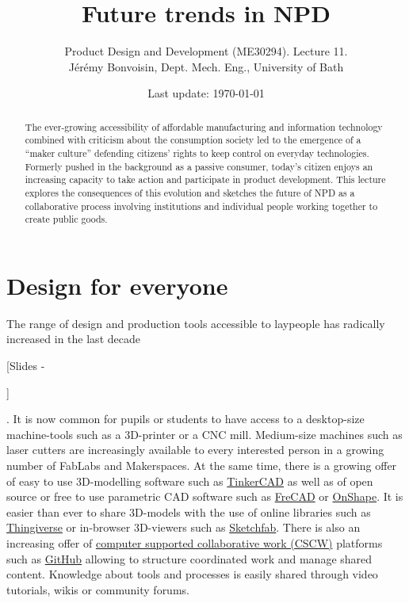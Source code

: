 \documentclass{article}
\newcounter{slide}
\begin{document}
\title{Future trends in NPD}

\author{Product Design and Development (ME30294). Lecture 11. \\ Jérémy Bonvoisin, Dept. Mech. Eng., University of Bath}
\date{Last update: \today}

\maketitle

\begin{abstract}
The ever-growing accessibility of affordable manufacturing and information technology combined with criticism about the consumption society led to the emergence of a ``maker culture'' defending citizens' rights to keep control on everyday technologies. Formerly pushed in the background as a passive consumer, today's citizen enjoys an increasing capacity to take action and participate in product development. This lecture explores the consequences of this evolution and sketches the future of NPD as a collaborative process involving institutions and individual people working together to create public goods.
\end{abstract}

\tableofcontents

\section{Design for everyone}
\label{sec:context}
The range of design and production tools accessible to laypeople has radically increased in the last decade {\color{blue}[Slides -\addtocounter{slide}{5}]}. It is now common for pupils or students to have access to a desktop-size machine-tools such as a 3D-printer or a CNC mill. Medium-size machines such as laser cutters are increasingly available to every interested person in a growing number of FabLabs and Makerspaces. At the same time, there is a growing offer of easy to use 3D-modelling software such as \href{https://www.tinkercad.com/}{TinkerCAD} as well as of open source or free to use parametric CAD software such as \href{https://www.freecadweb.org/}{FreCAD} or \href{https://www.onshape.com/}{OnShape}. It is easier than ever to share 3D-models with the use of online libraries such as \href{https://www.thingiverse.com/}{Thingiverse} or in-browser 3D-viewers such as \href{https://sketchfab.com/}{Sketchfab}. There is also an increasing offer of \href{https://en.wikipedia.org/wiki/Computer-supported_cooperative_work}{computer supported collaborative work (CSCW)} platforms such as \href{https://github.com/}{GitHub} allowing to structure coordinated work and manage shared content. Knowledge about tools and processes is easily shared through video tutorials, wikis or community forums.
\end{document}
